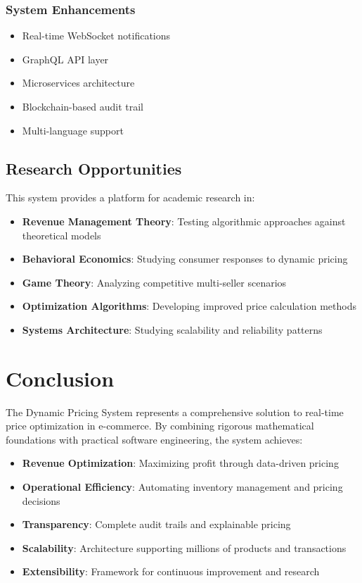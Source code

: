 \documentclass[12pt,a4paper,oneside]{report}
\begin{document}
\subsection{System Enhancements}

\begin{itemize}
    \item Real-time WebSocket notifications
    \item GraphQL API layer
    \item Microservices architecture
    \item Blockchain-based audit trail
    \item Multi-language support
\end{itemize}

\section{Research Opportunities}

This system provides a platform for academic research in:

\begin{itemize}
    \item \textbf{Revenue Management Theory}: Testing algorithmic approaches against theoretical models
    \item \textbf{Behavioral Economics}: Studying consumer responses to dynamic pricing
    \item \textbf{Game Theory}: Analyzing competitive multi-seller scenarios
    \item \textbf{Optimization Algorithms}: Developing improved price calculation methods
    \item \textbf{Systems Architecture}: Studying scalability and reliability patterns
\end{itemize}

\newpage

\chapter{Conclusion}

The Dynamic Pricing System represents a comprehensive solution to real-time price optimization in e-commerce. By combining rigorous mathematical foundations with practical software engineering, the system achieves:

\begin{itemize}
    \item \textbf{Revenue Optimization}: Maximizing profit through data-driven pricing
    \item \textbf{Operational Efficiency}: Automating inventory management and pricing decisions
    \item \textbf{Transparency}: Complete audit trails and explainable pricing
    \item \textbf{Scalability}: Architecture supporting millions of products and transactions
    \item \textbf{Extensibility}: Framework for continuous improvement and research
\end{itemize}
\end{document}
